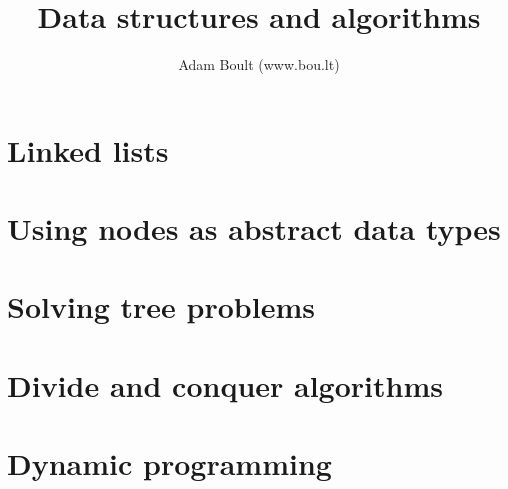 \documentclass[oneside]{book}
\begin{document}
\author{Adam Boult (www.bou.lt)}
\title{Data structures and algorithms}
\maketitle

\setcounter{tocdepth}{0}
\tableofcontents



\part{Linked lists}



\part{Using nodes as abstract data types}



\part{Solving tree problems}







\part{Divide and conquer algorithms}


\part{Dynamic programming}



\end{document}
